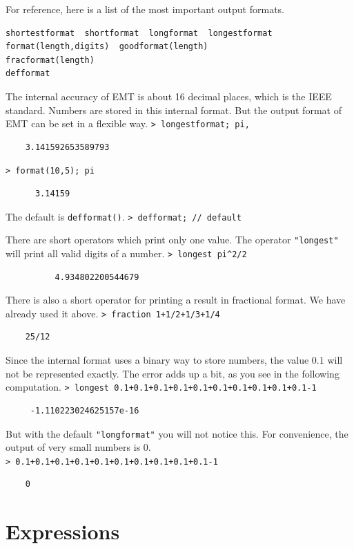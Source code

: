 \documentclass[11pt, a4paper]{article}
\newcommand{\emtcmd}[1]{\noindent\texttt{\textcolor{emtcommand}{>}\ #1}\par\smallskip}
\begin{document}
For reference, here is a list of the most important output formats.
\begin{verbatim}
shortestformat  shortformat  longformat  longestformat
format(length,digits)  goodformat(length)
fracformat(length)
defformat
\end{verbatim}

The internal accuracy of EMT is about 16 decimal places, which is the IEEE standard. Numbers are stored in this internal format. But the output format of EMT can be set in a flexible way.
\emtcmd{longestformat; pi,}
\begin{verbatim}
    3.141592653589793
\end{verbatim}
\emtcmd{format(10,5); pi}
\begin{verbatim}
      3.14159
\end{verbatim}

The default is \texttt{defformat()}.
\emtcmd{defformat; \textcolor{emtcomment}{// default}}

There are short operators which print only one value. The operator \texttt{"longest"} will print all valid digits of a number.
\emtcmd{longest pi\^{}2/2}
\begin{verbatim}
          4.934802200544679
\end{verbatim}

There is also a short operator for printing a result in fractional format. We have already used it above.
\emtcmd{fraction 1+1/2+1/3+1/4}
\begin{verbatim}
    25/12
\end{verbatim}

Since the internal format uses a binary way to store numbers, the value $0.1$ will not be represented exactly. The error adds up a bit, as you see in the following computation.
\emtcmd{longest 0.1+0.1+0.1+0.1+0.1+0.1+0.1+0.1+0.1+0.1-1}
\begin{verbatim}
     -1.110223024625157e-16
\end{verbatim}

But with the default \texttt{"longformat"} you will not notice this. For convenience, the output of very small numbers is 0.
\emtcmd{0.1+0.1+0.1+0.1+0.1+0.1+0.1+0.1+0.1+0.1-1}
\begin{verbatim}
    0
\end{verbatim}

\section*{Expressions}
\end{document}
